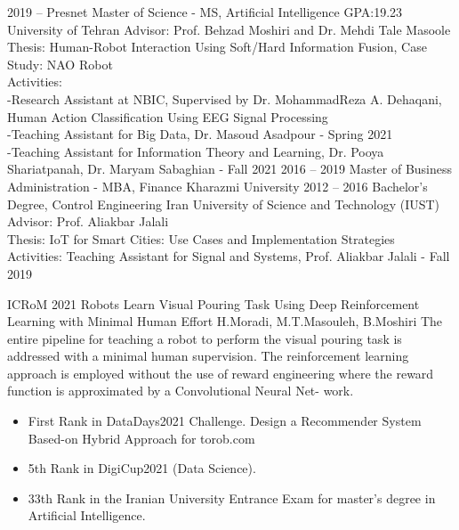 \documentclass[9pt]{developercv} %
\begin{document}
\begin{entrylist}
	\entry
		{2019 -- Presnet}
		{Master of Science - MS, Artificial Intelligence GPA:19.23}
		{University of Tehran}
		{Advisor: Prof. Behzad Moshiri and Dr. Mehdi Tale Masoole
		\\Thesis: Human-Robot Interaction Using Soft/Hard Information Fusion, Case Study: NAO Robot
		\\Activities: 
		\\-Research Assistant at NBIC, Supervised by Dr. MohammadReza A. Dehaqani, Human Action Classification Using EEG Signal Processing
		\\-Teaching Assistant for Big Data, Dr. Masoud Asadpour - Spring 2021
		\\ -Teaching Assistant for Information Theory and Learning, Dr. Pooya Shariatpanah, Dr. Maryam
Sabaghian - Fall 2021
		}
	\entry
		{2016 -- 2019}
		{Master of Business Administration - MBA, Finance}
		{Kharazmi University}	
		{}
	\entry
		{2012 -- 2016}
		{Bachelor's Degree, Control Engineering}
		{Iran University of Science and Technology (IUST)}
		{Advisor: Prof. Aliakbar Jalali
		\\Thesis: IoT for Smart Cities: Use Cases and Implementation Strategies
		\\Activities: Teaching Assistant for Signal and Systems, Prof. Aliakbar Jalali - Fall 2019}
	
\end{entrylist}


\begin{entrylist}
	\entry
		{ICRoM 2021}
		{Robots Learn Visual Pouring Task Using Deep Reinforcement Learning with Minimal Human
Effort}
		{H.Moradi, M.T.Masouleh, B.Moshiri}	
		{The entire pipeline for teaching a robot to perform the visual pouring task is addressed with a
minimal human supervision. The reinforcement learning approach is employed without the use
of reward engineering where the reward function is approximated by a Convolutional Neural Net-
work.}
\end{entrylist}


\renewcommand\labelitemi{\large$\bullet$}
\begin{itemize}

\item First Rank in DataDays2021 Challenge. Design a Recommender System Based-on Hybrid Approach for torob.com

\item 5th Rank in DigiCup2021 (Data Science).

\item 33th Rank in the Iranian University Entrance Exam for master’s degree in Artificial Intelligence.
\end{itemize}
\end{document}
